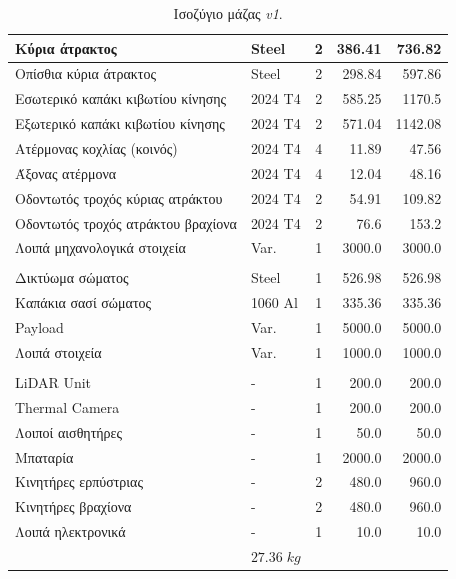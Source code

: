\begin{table}[H]
\begin{tabular}{|l|l|c|r|r|}
\hline
Κύρια άτρακτος & Steel & 2 & 386.41 & 736.82 \\
\hline
Οπίσθια κύρια άτρακτος & Steel & 2 & 298.84 & 597.86 \\
\hline
Εσωτερικό καπάκι κιβωτίου κίνησης & 2024 T4 & 2 & 585.25 & 1170.5 \\
\hline
Εξωτερικό καπάκι κιβωτίου κίνησης & 2024 T4 & 2 & 571.04 & 1142.08 \\
\hline
Ατέρμονας κοχλίας (κοινός) & 2024 T4 & 4 & 11.89 & 47.56 \\
\hline
Άξονας ατέρμονα & 2024 T4 & 4 & 12.04 & 48.16 \\
\hline
Οδοντωτός τροχός κύριας ατράκτου & 2024 T4 & 2 & 54.91 & 109.82 \\
\hline
Οδοντωτός τροχός ατράκτου βραχίονα & 2024 T4 & 2 & 76.6 & 153.2 \\
\hline
Λοιπά μηχανολογικά στοιχεία & Var. & 1 & 3000.0 & 3000.0 \\
\hline
\rowcolor{YellowGreen}
\multicolumn{5}{|c|}{Body Subsystem} \\
\hline
Δικτύωμα σώματος & Steel & 1 & 526.98 & 526.98 \\
\hline
Καπάκια σασί σώματος & 1060 Al & 1 & 335.36 & 335.36 \\
\hline
Payload & Var. & 1 & 5000.0 & 5000.0 \\
\hline
Λοιπά στοιχεία & Var. & 1 & 1000.0 & 1000.0 \\
\hline
\rowcolor{YellowGreen}
\multicolumn{5}{|c|}{Electronics Hardware} \\
\hline
LiDAR Unit & - & 1 & 200.0 & 200.0 \\
\hline
Thermal Camera & - & 1 & 200.0 & 200.0 \\
\hline
Λοιποί αισθητήρες & - & 1 & 50.0 & 50.0 \\
\hline
Μπαταρία & - & 1 & 2000.0 & 2000.0 \\
\hline
Κινητήρες ερπύστριας & - & 2 & 480.0 & 960.0 \\
\hline
Κινητήρες βραχίονα & - & 2 & 480.0 & 960.0 \\
\hline
Λοιπά ηλεκτρονικά & - & 1 & 10.0 & 10.0 \\
\hline
\rowcolor{BlueGreen}
\multicolumn{4}{|c|}{Grand Total Mass} & $27.36\; kg$ \\
\hline
\end{tabular}



    \caption{Ισοζύγιο μάζας \textit{v1}.}
    \label{tab:massBudgetV1}
\end{table}









